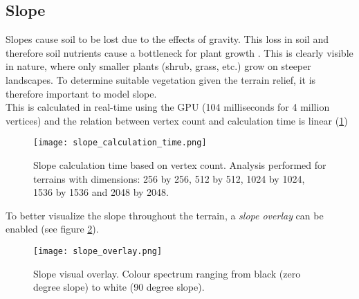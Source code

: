 \subsection{Slope}

Slopes cause soil to be lost due to the effects of gravity. This loss in soil and therefore soil nutrients cause a bottleneck for plant growth \cite{Kapolka2001}
. This is clearly visible in nature, where only smaller plants (shrub, grass, etc.) grow on steeper landscapes. To determine suitable vegetation given the terrain relief, it is therefore important to model slope.\\

This is calculated in real-time using the GPU (104 milliseconds for 4 million vertices) and the relation between vertex count and calculation time is linear (\ref{fig:slope_calculation_time})

\begin{figure}
\center
	\texttt{[image: slope\_calculation\_time.png]}
	\caption{ Slope calculation time based on vertex count. Analysis performed for terrains with dimensions: 256 by 256, 512 by 512, 1024 by 1024, 1536 by 1536 and 2048 by 2048.  }
	\label{fig:slope_calculation_time}
\end{figure}

To better visualize the slope throughout the terrain, a \textit{slope overlay} can be enabled (see figure \ref{fig:slope overlay}).

\begin{figure}
\center
	\texttt{[image: slope\_overlay.png]}
	\caption{ Slope visual overlay. Colour spectrum ranging from black (zero degree slope) to white (90 degree slope). }
	\label{fig:slope overlay}
\end{figure}
